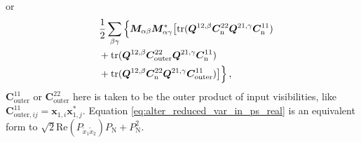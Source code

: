 \documentclass[12pt,a4paper]{article}
\begin{document}
or 
\begin{align}
\label{eq:alter_reduced_var_in_ps_real}
    & \frac{1}{2} \sum_{\beta\gamma} 
    \Big\{\bm{M}_{\alpha\beta} \bm{M}_{\alpha\gamma}^* \big[\text{tr}(\bm{Q}^{12,\beta} \bm{C}_\text{n}^{22} \bm{Q}^{21,\gamma} \bm{C}_\text{n}^{11}) 
    \notag \\
    \phantom{=} & + \text{tr}(\bm{Q}^{12,\beta} \bm{C}_\text{outer}^{22} \bm{Q}^{21,\gamma} \bm{C}_\text{n}^{11}) 
    \notag \\ 
    \phantom{=} & + \text{tr}(\bm{Q}^{12,\beta} \bm{C}_\text{n}^{22} \bm{Q}^{21,\gamma} \bm{C}_\text{outer}^{11}) \big]  \Big\}\,,
\end{align}
$\bm{C}_\text{outer}^{11}$ or $\bm{C}_\text{outer}^{22}$ here is taken to be the outer product of input visibilities, like $\bm{C}_{\text{outer}, ij}^{11} = \bm{x}_{1,i} \bm{x}_{1,j}^*$. Equation \ref{eq:alter_reduced_var_in_ps_real}
is an equivalent form to $\sqrt{2}\text{Re} (P_{\tilde{x}_1\tilde{x}_2}) P_\text{N} + P_\text{N}^2$. 
\end{document}
